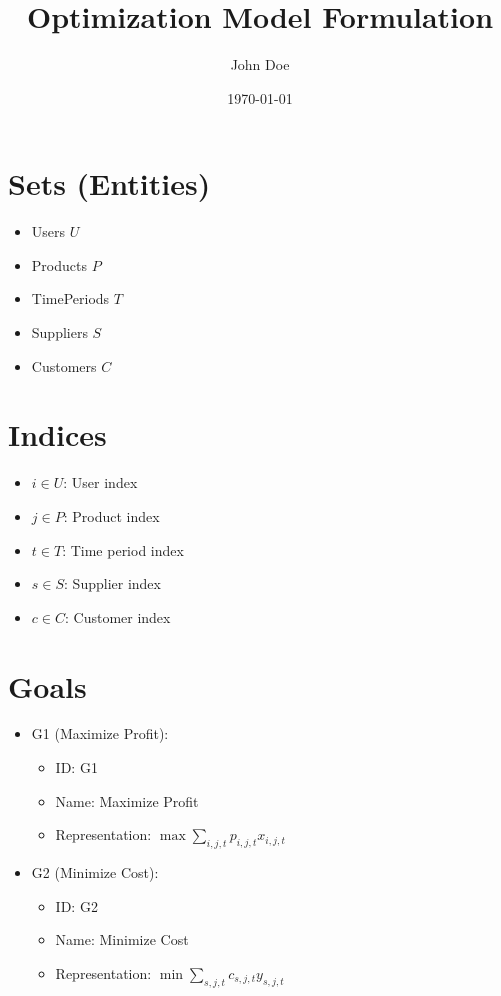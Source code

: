 \documentclass{article}
\title{Optimization Model Formulation}
\author{John Doe}
\date{\today}
\begin{document}
\maketitle
\tableofcontents
\newpage

\section{Sets (Entities)}
\begin{itemize}
    \item Users $U$
    \item Products $P$
    \item TimePeriods $T$
    \item Suppliers $S$
    \item Customers $C$
\end{itemize}

\section{Indices}
\begin{itemize}
    \item $i \in U$: User index
    \item $j \in P$: Product index
    \item $t \in T$: Time period index
    \item $s \in S$: Supplier index
    \item $c \in C$: Customer index
\end{itemize}

\section{Goals}
\begin{itemize}
    \item G1 (Maximize Profit): 
    \begin{itemize}
        \item ID: G1
        \item Name: Maximize Profit
        \item Representation: $\max \sum_{i,j,t} p_{i,j,t} x_{i,j,t}$
    \end{itemize}
    \item G2 (Minimize Cost): 
    \begin{itemize}
        \item ID: G2
        \item Name: Minimize Cost
        \item Representation: $\min \sum_{s,j,t} c_{s,j,t} y_{s,j,t}$
    \end{itemize}
\end{itemize}
\end{document}
